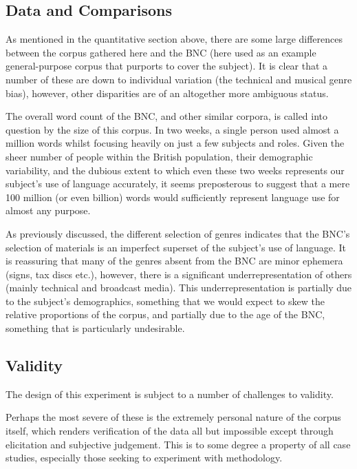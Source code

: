 \subsection{Data and Comparisons}
As mentioned in the quantitative section above, there are some large differences between the corpus gathered here and the BNC (here used as an example general-purpose corpus that purports to cover the subject).  It is clear that a number of these are down to individual variation (the technical and musical genre bias), however, other disparities are of an altogether more ambiguous status.

The overall word count of the BNC, and other similar corpora, is called into question by the size of this corpus.  In two weeks, a single person used almost a million words whilst focusing heavily on just a few subjects and roles.  Given the sheer number of people within the British population, their demographic variability, and the dubious extent to which even these two weeks represents our subject's use of language accurately, it seems preposterous to suggest that a mere 100 million (or even billion) words would sufficiently represent language use for almost any purpose.


As previously discussed, the different selection of genres indicates that the BNC's selection of materials is an imperfect superset of the subject's use of language.  It is reassuring that many of the genres absent from the BNC are minor ephemera (signs, tax discs etc.), however, there is a significant underrepresentation of others (mainly technical and broadcast media).  This underrepresentation is partially due to the subject's demographics, something that we would expect to skew the relative proportions of the corpus, and partially due to the age of the BNC, something that is particularly undesirable.












\subsection{Validity}
The design of this experiment is subject to a number of challenges to validity.

Perhaps the most severe of these is the extremely personal nature of the corpus itself, which renders verification of the data all but impossible except through elicitation and subjective judgement.  This is to some degree a property of all case studies, especially those seeking to experiment with methodology.

